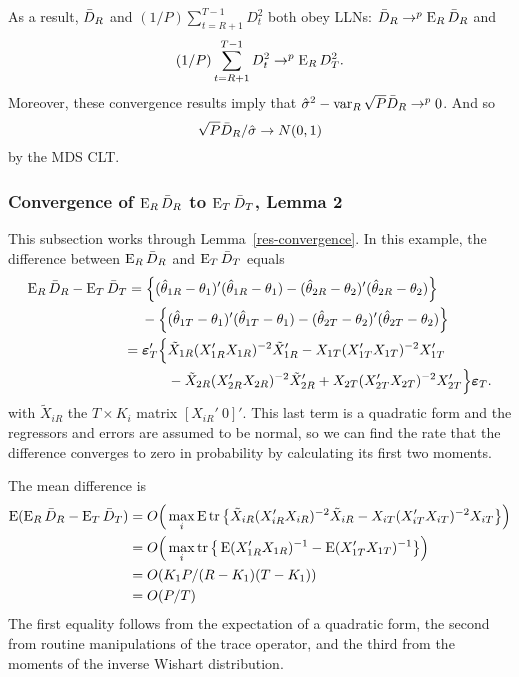 \documentclass[12pt]{article}
\begin{document}
As a result, $\bar{D}_{R}$ and $(1/P) \sum_{t=R+1}^{T-1} D_t^2$ both obey
LLNs: $\bar{D}_{R} \to^p \operatorname{E}_R \bar{D}_{R}$ and
\begin{equation*}
  (1/P) \sum_{t=R+1}^{T-1} D_t^2 \to^p \operatorname{E}_R D_T^2.
\end{equation*}
Moreover, these convergence results imply that $\hat{\sigma}^2 - \operatorname{var}_R
\sqrt{P} \bar{D}_{R} \to^p 0$. And so
\begin{equation*}
  \sqrt{P} \bar{D}_{R}/\hat{\sigma} \to N(0,1)
\end{equation*}
by the MDS CLT.

\subsubsection*{Convergence of $\operatorname{E}_R \bar{D}_{R}$ to $\operatorname{E}_T \bar{D}_{T}$, Lemma 2}

This subsection works through Lemma~\ref{res-convergence}. In this
example, the difference between $\operatorname{E}_R \bar{D}_{R}$ and $\operatorname{E}_T \bar{D}_{T}$ equals
\begin{equation*}
  \begin{split}
    \operatorname{E}_R \bar{D}_{R} - \operatorname{E}_T \bar{D}_{T} &= \Big\{(\hat\theta_{1R} - \theta_1)'(\hat\theta_{1R} -
    \theta_1) -
    (\hat\theta_{2R} - \theta_2)'(\hat\theta_{2R} - \theta_2)\Big\} \\
    & \quad - \Big\{(\hat\theta_{1T} - \theta_1)'(\hat\theta_{1T} - \theta_1) -
    (\hat\theta_{2T} - \theta_2)'(\hat\theta_{2T} - \theta_2)\Big\} \\
    &\begin{split}
      =\boldsymbol{\varepsilon}_{T}'\Big\{
      & \tilde{X}_{1R}(X_{1R}'X_{1R})^{-2} \tilde{X}_{1R}'
      - X_{1T}(X_{1T}'X_{1T})^{-2} X_{1T}' \\
      & - \tilde{X}_{2R}(X_{2R}'X_{2R})^{-2} \tilde{X}_{2R}'
      + X_{2T}(X_{2T}'X_{2T})^{-2} X_{2T}'
      \Big\}\boldsymbol{\varepsilon}_{T}.
    \end{split}
  \end{split}
\end{equation*}
with $\tilde{X}_{iR}$ the $T \times K_i$ matrix $[X_{iR}'\ 0]'$. This
last term is a quadratic form and the regressors and errors are
assumed to be normal, so we can find the rate that the difference
converges to zero in probability by calculating its first two moments.

The mean difference is
\begin{equation*}
  \begin{split}
  \operatorname{E}(\operatorname{E}_R \bar{D}_{R} - \operatorname{E}_T \bar{D}_{T})
      &=O\Big(\max_i \operatorname{E} \operatorname{tr} \big\{
        \tilde{X}_{iR}(X_{iR}'X_{iR})^{-2} \tilde{X}_{iR}
        - X_{iT}(X_{iT}'X_{iT})^{-2} X_{iT} \big\} \Big) \\
      &=O\Big(\max_i \operatorname{tr} \big\{\operatorname{E} (X_{1R}'X_{1R})^{-1}
         - \operatorname{E} (X_{1T}'X_{1T})^{-1} \big\}\Big) \\
      &=O( K_1 P / (R-K_1)(T-K_1)) \\
      &=O(P/T)
    \end{split}
\end{equation*}
The first equality follows from the expectation of a quadratic form,
the second from routine manipulations of the trace operator, and the
third from the moments of the inverse Wishart distribution.
\end{document}

